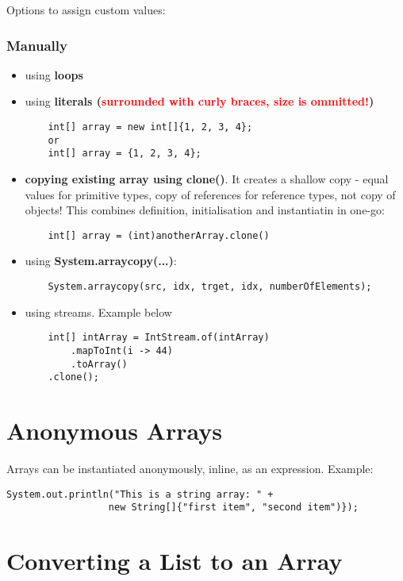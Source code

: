 \documentclass{report}
\begin{document}
Options to assign custom values:
\subsubsection{Manually}
\begin{itemize}
	\item using \textbf{loops}
	
	\item using \textbf{literals (\textcolor{red}{surrounded with curly braces, size is ommitted!})}
	\begin{verbatim}
	int[] array = new int[]{1, 2, 3, 4};
	or
	int[] array = {1, 2, 3, 4};
	\end{verbatim}
	
	\item \textbf{copying existing array using clone()}. It creates a shallow copy -
	equal values for primitive types, copy of references for reference types, not copy of objects!
	This combines definition, initialisation and instantiatin in one-go:
	\begin{verbatim}
	int[] array = (int)anotherArray.clone()
	\end{verbatim}
	
	\item using \textbf{System.arraycopy(...)}:
	\begin{verbatim}
	System.arraycopy(src, idx, trget, idx, numberOfElements);
	\end{verbatim}
	
	\item using streams. Example below
		\begin{verbatim}
	int[] intArray = IntStream.of(intArray)
	    .mapToInt(i -> 44)
	    .toArray()
    .clone();
\end{verbatim}
\end{itemize}


\section{Anonymous Arrays}
Arrays can be instantiated anonymously, inline, as an expression.
Example:
\begin{verbatim}
System.out.println("This is a string array: " +
                  new String[]{"first item", "second item")});
\end{verbatim}


\section{Converting a List to an Array}
\end{document}
